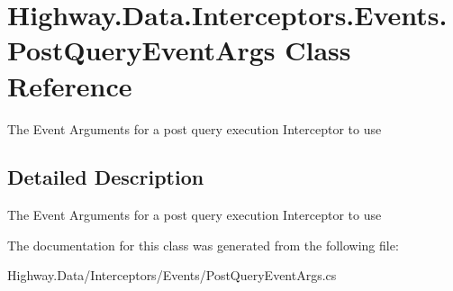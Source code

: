 \hypertarget{class_highway_1_1_data_1_1_interceptors_1_1_events_1_1_post_query_event_args}{\section{Highway.\-Data.\-Interceptors.\-Events.\-Post\-Query\-Event\-Args Class Reference}
\label{class_highway_1_1_data_1_1_interceptors_1_1_events_1_1_post_query_event_args}
}


The Event Arguments for a post query execution Interceptor to use  




\subsection{Detailed Description}
The Event Arguments for a post query execution Interceptor to use 



The documentation for this class was generated from the following file\-:\begin{DoxyCompactItemize}
\item 
Highway.\-Data/\-Interceptors/\-Events/Post\-Query\-Event\-Args.\-cs\end{DoxyCompactItemize}
